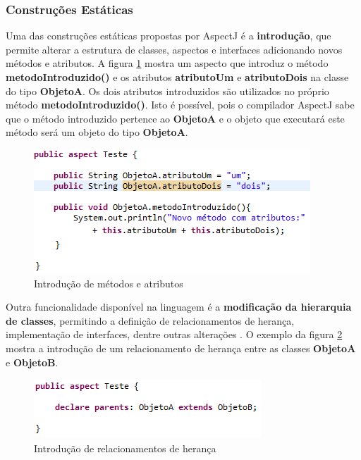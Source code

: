 \subsubsection{Construções Estáticas}

Uma das construções estáticas propostas por AspectJ é a \textbf{introdução}, que
permite alterar a estrutura de classes, aspectos e interfaces adicionando novos
métodos e atributos. A figura \ref{fig:introduction} mostra um aspecto que
introduz o método \textbf{metodoIntroduzido()} e os atributos
\textbf{atributoUm} e \textbf{atributoDois} na classe do tipo \textbf{ObjetoA}.
Os dois atributos introduzidos são utilizados no próprio método
\textbf{metodoIntroduzido()}. Isto é possível, pois
o compilador AspectJ sabe que o método introduzido pertence ao \textbf{ObjetoA}
e o objeto que executará este método será um objeto do tipo \textbf{ObjetoA}.

\begin{figure}
	\centering
	\includegraphics{img/introduction.png}
	\caption{Introdução de métodos e atributos}\label{fig:introduction}
\end{figure}

Outra funcionalidade disponível na linguagem é a \textbf{modificação da hierarquia de classes}, permitindo a definição de
relacionamentos de herança, implementação de interfaces, dentre outras
alterações \cite{Laddad:2003:AAP:993468}. O exemplo da figura
\ref{fig:introduction_interface} mostra a introdução de um relacionamento de
herança entre as classes \textbf{ObjetoA} e \textbf{ObjetoB}.

\begin{figure}
	\centering
	\includegraphics{img/introduction_interface.png}
	\caption{Introdução de relacionamentos de herança}\label{fig:introduction_interface}
\end{figure}


